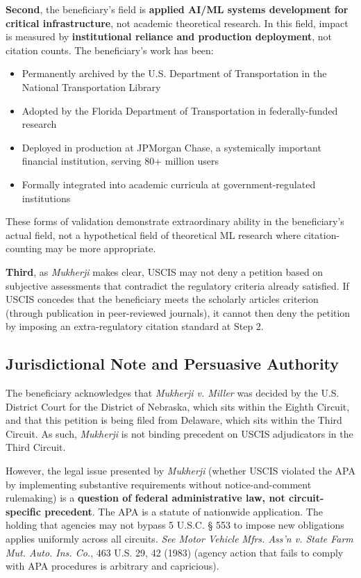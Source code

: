 \textbf{Second}, the beneficiary's field is \textbf{applied AI/ML systems development for critical infrastructure}, not academic theoretical research. In this field, impact is measured by \textbf{institutional reliance and production deployment}, not citation counts. The beneficiary's work has been:
\begin{itemize}
    \item Permanently archived by the U.S. Department of Transportation in the National Transportation Library
    \item Adopted by the Florida Department of Transportation in federally-funded research
    \item Deployed in production at JPMorgan Chase, a systemically important financial institution, serving 80+ million users
    \item Formally integrated into academic curricula at government-regulated institutions
\end{itemize}

These forms of validation demonstrate extraordinary ability in the beneficiary's actual field, not a hypothetical field of theoretical ML research where citation-counting may be more appropriate.

\textbf{Third}, as \textit{Mukherji} makes clear, USCIS may not deny a petition based on subjective assessments that contradict the regulatory criteria already satisfied. If USCIS concedes that the beneficiary meets the scholarly articles criterion (through publication in peer-reviewed journals), it cannot then deny the petition by imposing an extra-regulatory citation standard at Step 2.

\subsection{Jurisdictional Note and Persuasive Authority}

The beneficiary acknowledges that \textit{Mukherji v. Miller} was decided by the U.S. District Court for the District of Nebraska, which sits within the Eighth Circuit, and that this petition is being filed from Delaware, which sits within the Third Circuit. As such, \textit{Mukherji} is not binding precedent on USCIS adjudicators in the Third Circuit.

However, the legal issue presented by \textit{Mukherji} (whether USCIS violated the APA by implementing substantive requirements without notice-and-comment rulemaking) is a \textbf{question of federal administrative law, not circuit-specific precedent}. The APA is a statute of nationwide application. The holding that agencies may not bypass 5 U.S.C. § 553 to impose new obligations applies uniformly across all circuits. \textit{See Motor Vehicle Mfrs. Ass'n v. State Farm Mut. Auto. Ins. Co.}, 463 U.S. 29, 42 (1983) (agency action that fails to comply with APA procedures is arbitrary and capricious).


